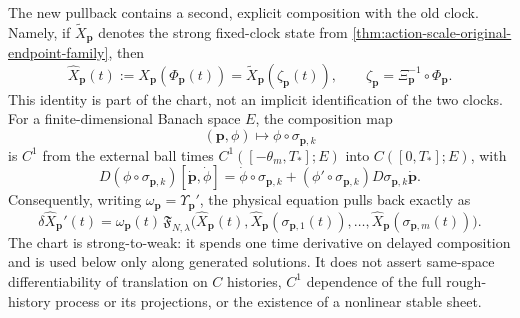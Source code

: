 \begin{lemma}
The new pullback contains a second, explicit composition with the old
clock.  Namely, if \(\widetilde X_{\mathbf p}\) denotes the strong
fixed-clock state from
\cref{thm:action-scale-original-endpoint-family}, then
\begin{equation}
 \widehat X_{\mathbf p}(t)
 :=X_{\mathbf p}(\Phi_{\mathbf p}(t))
 =\widetilde X_{\mathbf p}(\zeta_{\mathbf p}(t)),
 \qquad
 \zeta_{\mathbf p}
 =\Xi_{\mathbf p}^{-1}\circ\Phi_{\mathbf p}.   \label{eq:oe-entry-relative-double-composition}
\end{equation}
This identity is part of the chart, not an implicit identification of
the two clocks.  For a finite-dimensional Banach space \(E\), the
composition map
\begin{equation}
 (\mathbf p,\phi)\longmapsto
       \phi\circ\sigma_{\mathbf p,k}            \label{eq:oe-entry-relative-composition-map}
\end{equation}
is \(C^1\) from the external ball times
\(C^1([-\theta_m,T_*];E)\) into \(C([0,T_*];E)\), with
\begin{equation}
 D(\phi\circ\sigma_{\mathbf p,k})
       [\dot{\mathbf p},\dot\phi]
 =\dot\phi\circ\sigma_{\mathbf p,k}
  +(\phi'\circ\sigma_{\mathbf p,k})
       D\sigma_{\mathbf p,k}\dot{\mathbf p}.   \label{eq:oe-entry-relative-composition-derivative}
\end{equation}
Consequently, writing
\(\omega_{\mathbf p}=\Upsilon_{\mathbf p}'\), the physical equation
pulls back exactly as
\begin{equation}
 \delta\widehat X_{\mathbf p}'(t)
 =\omega_{\mathbf p}(t)\,
 \mathfrak F_{N,\lambda}
 \bigl(\widehat X_{\mathbf p}(t),
       \widehat X_{\mathbf p}(\sigma_{\mathbf p,1}(t)),\ldots,
       \widehat X_{\mathbf p}(\sigma_{\mathbf p,m}(t))\bigr).
                                                        \label{eq:oe-entry-relative-pulled-rfde}
\end{equation}
The chart is strong-to-weak: it spends one time derivative on delayed
composition and is used below only along generated solutions.  It does
not assert same-space differentiability of translation on \(C\)
histories, \(C^1\) dependence of the full rough-history process or its
projections, or the existence of a nonlinear stable sheet.
\end{lemma}

